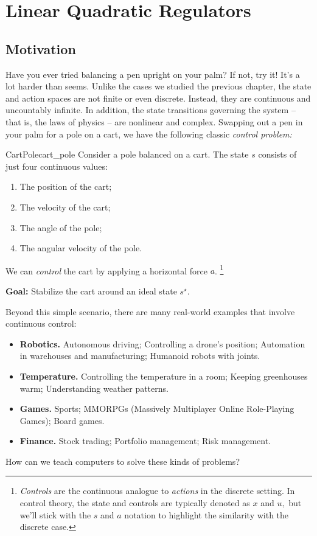 \documentclass[../main/main]{subfiles}
\begin{document}
    
\chapter{Linear Quadratic Regulators}


\section{Motivation}

Have you ever tried balancing a pen upright on your palm?
If not, try it! It's a lot harder than seems.
Unlike the cases we studied the previous chapter,
the state and action spaces are not finite or even discrete.
Instead, they are continuous and uncountably infinite.
In addition, the state transitions governing the system -- that is, the laws of physics --
are nonlinear and complex.
Swapping out a pen in your palm for a pole on a cart,
we have the following classic \emph{control problem:}

\begin{example}{CartPole}{cart_pole}
    Consider a pole balanced on a cart.
    The state $s$ consists of just four continuous values:

    \begin{enumerate}
        \item The position of the cart;
        \item The velocity of the cart;
        \item The angle of the pole;
        \item The angular velocity of the pole.
    \end{enumerate}

    \noindent
    We can \emph{control} the cart by applying a horizontal force $a$.
    \footnote{\emph{Controls} are the continuous analogue to \emph{actions} in the discrete setting. In control theory, the state and controls are typically denoted as
    $x$ and $u,$ but we'll stick with the $s$ and $a$ notation to highlight the
    similarity with the discrete case.}

    \noindent
    \textbf{Goal:} Stabilize the cart around an ideal state $s^\star$.
\end{example}

Beyond this simple scenario, there are many real-world examples that involve continuous control:
\begin{itemize}
    \item \textbf{Robotics.} Autonomous driving; Controlling a drone's position; Automation in warehouses and manufacturing; Humanoid robots with joints.
    \item \textbf{Temperature.} Controlling the temperature in a room; Keeping greenhouses warm; Understanding weather patterns.
    \item \textbf{Games.} Sports; MMORPGs (Massively Multiplayer Online Role-Playing Games); Board games.
    \item \textbf{Finance.} Stock trading; Portfolio management; Risk management.
\end{itemize}
How can we teach computers to solve these kinds of problems?
\end{document}
